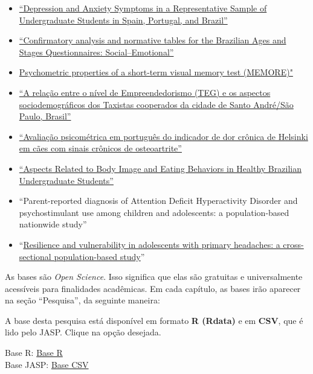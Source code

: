 \documentclass[
]{book}
\begin{document}
\begin{itemize}
\item
  \href{https://doi.org/10.1590/0102.3772e36412}{``Depression and Anxiety Symptoms in a Representative Sample of Undergraduate Students in Spain, Portugal, and Brazil''}
\item
  \href{https://onlinelibrary.wiley.com/doi/abs/10.1111/cch.12649}{``Confirmatory analysis and normative tables for the Brazilian Ages and Stages Questionnaires: Social--Emotional''}
\item
  \href{https://www.neuropsicolatina.org/index.php/Neuropsicologia_Latinoamericana/article/view/545}{Psychometric properties of a short-term visual memory test (MEMORE)"}
\item
  \href{https://www.metodista.br/revistas/revistas-metodista/index.php/REGS/article/view/6453}{``A relação entre o nível de Empreendedorismo (TEG) e os aspectos sociodemográficos dos Taxistas cooperados da cidade de Santo André/São Paulo, Brasil''}
\item
  \href{https://www.scielo.br/scielo.php?script=sci_arttext\&pid=S0102-09352019000100109}{``Avaliação psicométrica em português do indicador de dor crônica de Helsinki em cães com sinais crônicos de osteoartrite''}
\item
  \href{https://www.researchgate.net/publication/323729370_Aspects_Related_to_Body_Image_and_Eating_Behaviors_in_Healthy_Brazilian_Undergraduate_Students}{``Aspects Related to Body Image and Eating Behaviors in Healthy Brazilian Undergraduate Students''}
\item
  ``Parent-reported diagnosis of Attention Deficit Hyperactivity Disorder and psychostimulant use among children and adolescents: a population-based nationwide study''
\item
  ``\href{https://pubmed.ncbi.nlm.nih.gov/33720394/}{Resilience and vulnerability in adolescents with primary headaches: a cross-sectional population-based study}''
\end{itemize}

As bases são \emph{Open Science}. Isso significa que elas são gratuitas e universalmente acessíveis para finalidades acadêmicas. Em cada capítulo, as bases irão aparecer na seção ``Pesquisa'', da seguinte maneira:

A base desta pesquisa está disponível em formato \textbf{R (Rdata)} e em \textbf{CSV}, que é lido pelo JASP. Clique na opção desejada.

Base R: \href{}{Base R}\\
Base JASP: \href{}{Base CSV}
\end{document}
